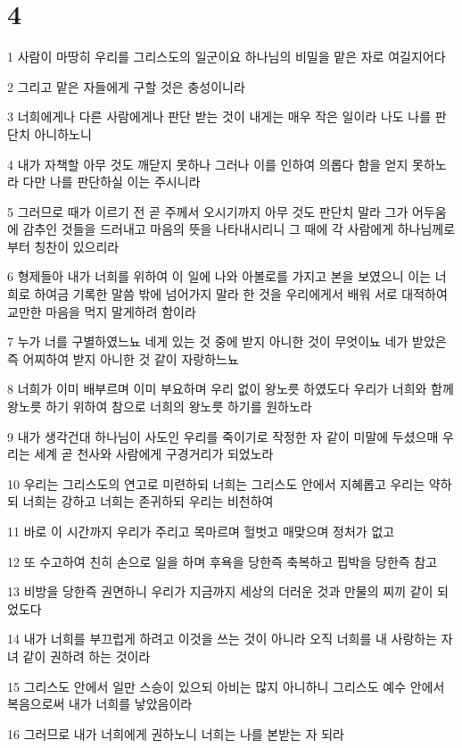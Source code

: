 \chapter{4}

\par 1 사람이 마땅히 우리를 그리스도의 일군이요 하나님의 비밀을 맡은 자로 여길지어다
\par 2 그리고 맡은 자들에게 구할 것은 충성이니라
\par 3 너희에게나 다른 사람에게나 판단 받는 것이 내게는 매우 작은 일이라 나도 나를 판단치 아니하노니
\par 4 내가 자책할 아무 것도 깨닫지 못하나 그러나 이를 인하여 의롭다 함을 얻지 못하노라 다만 나를 판단하실 이는 주시니라
\par 5 그러므로 때가 이르기 전 곧 주께서 오시기까지 아무 것도 판단치 말라 그가 어두움에 감추인 것들을 드러내고 마음의 뜻을 나타내시리니 그 때에 각 사람에게 하나님께로부터 칭찬이 있으리라
\par 6 형제들아 내가 너희를 위하여 이 일에 나와 아볼로를 가지고 본을 보였으니 이는 너희로 하여금 기록한 말씀 밖에 넘어가지 말라 한 것을 우리에게서 배워 서로 대적하여 교만한 마음을 먹지 말게하려 함이라
\par 7 누가 너를 구별하였느뇨 네게 있는 것 중에 받지 아니한 것이 무엇이뇨 네가 받았은즉 어찌하여 받지 아니한 것 같이 자랑하느뇨
\par 8 너희가 이미 배부르며 이미 부요하며 우리 없이 왕노릇 하였도다 우리가 너희와 함께 왕노릇 하기 위하여 참으로 너희의 왕노릇 하기를 원하노라
\par 9 내가 생각건대 하나님이 사도인 우리를 죽이기로 작정한 자 같이 미말에 두셨으매 우리는 세계 곧 천사와 사람에게 구경거리가 되었노라
\par 10 우리는 그리스도의 연고로 미련하되 너희는 그리스도 안에서 지혜롭고 우리는 약하되 너희는 강하고 너희는 존귀하되 우리는 비천하여
\par 11 바로 이 시간까지 우리가 주리고 목마르며 헐벗고 매맞으며 정처가 없고
\par 12 또 수고하여 친히 손으로 일을 하며 후욕을 당한즉 축복하고 핍박을 당한즉 참고
\par 13 비방을 당한즉 권면하니 우리가 지금까지 세상의 더러운 것과 만물의 찌끼 같이 되었도다
\par 14 내가 너희를 부끄럽게 하려고 이것을 쓰는 것이 아니라 오직 너희를 내 사랑하는 자녀 같이 권하려 하는 것이라
\par 15 그리스도 안에서 일만 스승이 있으되 아비는 많지 아니하니 그리스도 예수 안에서 복음으로써 내가 너희를 낳았음이라
\par 16 그러므로 내가 너희에게 권하노니 너희는 나를 본받는 자 되라
